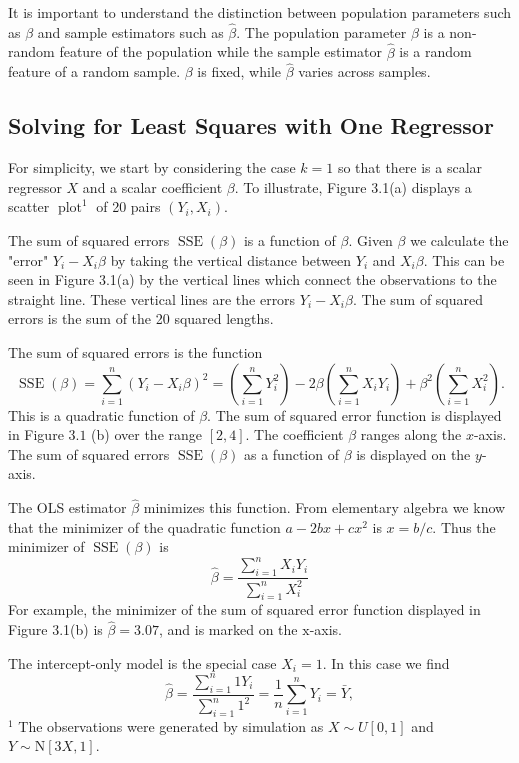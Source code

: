 \documentclass[10pt]{article}
\begin{document}
It is important to understand the distinction between population parameters such as $\beta$ and sample estimators such as $\widehat{\beta}$. The population parameter $\beta$ is a non-random feature of the population while the sample estimator $\widehat{\beta}$ is a random feature of a random sample. $\beta$ is fixed, while $\widehat{\beta}$ varies across samples.

\subsection{Solving for Least Squares with One Regressor}
For simplicity, we start by considering the case $k=1$ so that there is a scalar regressor $X$ and a scalar coefficient $\beta$. To illustrate, Figure 3.1(a) displays a scatter $\operatorname{plot}^{1}$ of 20 pairs $\left(Y_{i}, X_{i}\right)$.

The sum of squared errors $\operatorname{SSE}(\beta)$ is a function of $\beta$. Given $\beta$ we calculate the "error" $Y_{i}-X_{i} \beta$ by taking the vertical distance between $Y_{i}$ and $X_{i} \beta$. This can be seen in Figure 3.1(a) by the vertical lines which connect the observations to the straight line. These vertical lines are the errors $Y_{i}-X_{i} \beta$. The sum of squared errors is the sum of the 20 squared lengths.

The sum of squared errors is the function
$$
\operatorname{SSE}(\beta)=\sum_{i=1}^{n}\left(Y_{i}-X_{i} \beta\right)^{2}=\left(\sum_{i=1}^{n} Y_{i}^{2}\right)-2 \beta\left(\sum_{i=1}^{n} X_{i} Y_{i}\right)+\beta^{2}\left(\sum_{i=1}^{n} X_{i}^{2}\right) .
$$
This is a quadratic function of $\beta$. The sum of squared error function is displayed in Figure $3.1$ (b) over the range $[2,4]$. The coefficient $\beta$ ranges along the $x$-axis. The sum of squared errors $\operatorname{SSE}(\beta)$ as a function of $\beta$ is displayed on the $y$-axis.

The OLS estimator $\widehat{\beta}$ minimizes this function. From elementary algebra we know that the minimizer of the quadratic function $a-2 b x+c x^{2}$ is $x=b / c$. Thus the minimizer of $\operatorname{SSE}(\beta)$ is
$$
\widehat{\beta}=\frac{\sum_{i=1}^{n} X_{i} Y_{i}}{\sum_{i=1}^{n} X_{i}^{2}}
$$
For example, the minimizer of the sum of squared error function displayed in Figure 3.1(b) is $\widehat{\beta}=3.07$, and is marked on the $\mathrm{x}$-axis.

The intercept-only model is the special case $X_{i}=1$. In this case we find
$$
\widehat{\beta}=\frac{\sum_{i=1}^{n} 1 Y_{i}}{\sum_{i=1}^{n} 1^{2}}=\frac{1}{n} \sum_{i=1}^{n} Y_{i}=\bar{Y},
$$
${ }^{1}$ The observations were generated by simulation as $X \sim U[0,1]$ and $Y \sim \mathrm{N}[3 X, 1]$.
\end{document}
